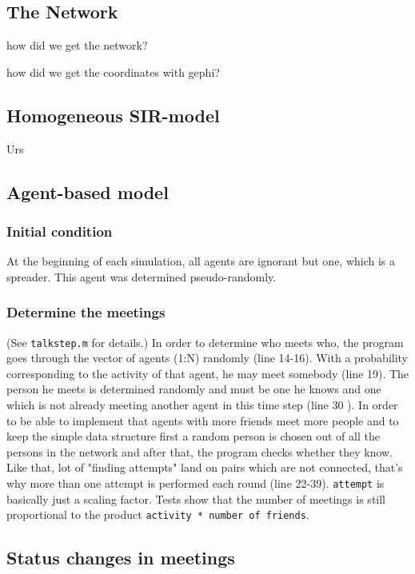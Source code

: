 \subsection{The Network}
how did we get the network?

how did we get the coordinates with gephi?

\subsection{Homogeneous SIR-model}

Urs

\subsection{Agent-based model}

\subsubsection{Initial condition}

At the beginning of each simulation, all agents are ignorant but one, which is a spreader. This agent was determined pseudo-randomly.

\subsubsection{Determine the meetings}

(See \texttt{talkstep.m} for details.)
\newline
\newline
In order to determine who meets who, the program goes through the vector of agents (1:N) randomly (line 14-16). With a probability corresponding to the activity of that agent, he may meet somebody (line 19). The person he meets is determined randomly and must be one he knows and one which is not already meeting another agent in this time step (line 30 ). In order to be able to implement that agents with more friends meet more people and to keep the simple data structure first a random person is chosen out of all the persons in the network and after that, the program checks whether they know. Like that, lot of "finding attempts" land on pairs which are not connected, that's why more than one attempt is performed each round (line 22-39). \texttt{attempt} is basically just a scaling factor. Tests show that the number of meetings is still proportional to the product \texttt{activity * number of friends}.

\subsection{Status changes in meetings}


